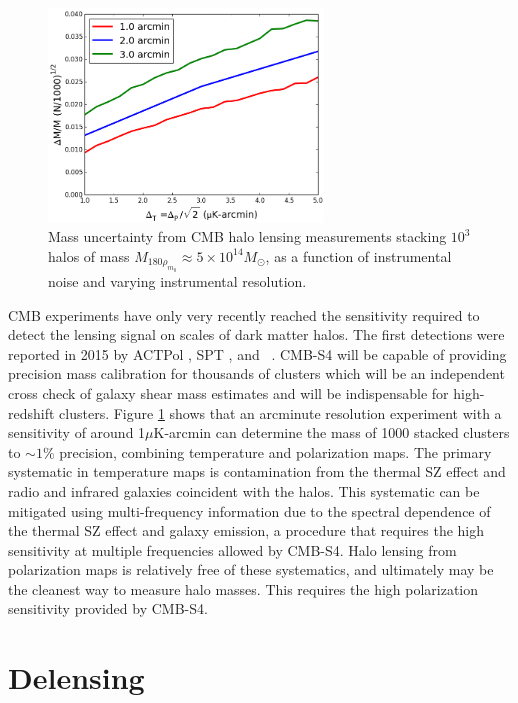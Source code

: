 \begin{figure}[htbp]
\centering 
\includegraphics[width=0.65\textwidth]{CMBLensing/HaloLens.png}
\caption{Mass uncertainty from CMB halo lensing measurements stacking $10^3$ halos of mass $M_{180\rho_{m_0}} \approx 5\times 10^{14} M_{\odot}$, as a function of instrumental noise and varying instrumental resolution.}
\label{haloLens}
\end{figure}

CMB experiments have only very recently reached the sensitivity required to detect the lensing signal on scales of dark matter halos.  The first detections were reported in 2015 by ACTPol \cite{Madhavacheril:2014slf}, SPT \cite{Baxter:2014frs}, and \planck\ \cite{Ade:2015fva}.  CMB-S4 will be capable of providing precision mass calibration for thousands of clusters which will be an independent cross check of galaxy shear mass estimates and will be indispensable for high-redshift clusters. Figure \ref{haloLens} shows that an arcminute resolution experiment with a sensitivity of around 1$\mu$K-arcmin can determine the mass of 1000 stacked clusters to $\sim 1\%$ precision, combining temperature and polarization maps. The primary systematic in temperature maps is contamination from the thermal SZ effect and radio and infrared galaxies coincident with the halos. This systematic can be mitigated using multi-frequency information due to the spectral dependence of the thermal SZ effect and galaxy emission, a procedure that requires the high sensitivity at multiple frequencies allowed by CMB-S4.  Halo lensing from polarization maps is relatively free of these systematics, and ultimately may be the cleanest way to measure halo masses.  This requires the high polarization sensitivity provided by CMB-S4. 


\section{Delensing}\label{delens}

